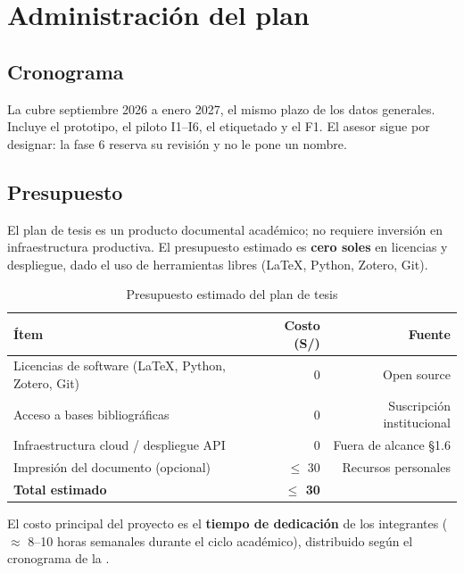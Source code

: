\chapter{Administración del plan}
\label{cap:administracion}

\section{Cronograma}

La  cubre septiembre 2026 a enero 2027, el mismo plazo de los datos
generales. Incluye el prototipo, el piloto I1--I6, el etiquetado y el F1. El asesor sigue por
designar: la fase 6 reserva su revisión y no le pone un nombre.



\section{Presupuesto}

El plan de tesis es un producto documental académico; no requiere
inversión en infraestructura productiva. El presupuesto estimado es \textbf{cero soles} en licencias
y despliegue, dado el uso de herramientas libres (\LaTeX{}, Python, Zotero, Git).

\begin{table}[H]
  \centering
  \caption{Presupuesto estimado del plan de tesis}
  \label{tab:presupuesto}
  \small
  \begin{tabular}{@{}p{}rr@{}}
    \toprule
    \textbf{Ítem} & \textbf{Costo (S/)} & \textbf{Fuente} \\
    \midrule
    Licencias de software (\LaTeX{}, Python, Zotero, Git) & 0 & Open source \\
    Acceso a bases bibliográficas & 0 & Suscripción institucional \\
    Infraestructura cloud / despliegue API & 0 & Fuera de alcance §1.6 \\
    Impresión del documento (opcional) & $\leq$ 30 & Recursos personales \\
    \midrule
    \textbf{Total estimado} & \textbf{$\leq$ 30} & \\
    \bottomrule
  \end{tabular}
\end{table}

El costo principal del proyecto es el \textbf{tiempo de dedicación} de los integrantes
($\approx$ 8--10 horas semanales durante el ciclo académico), distribuido según el cronograma de la
.


